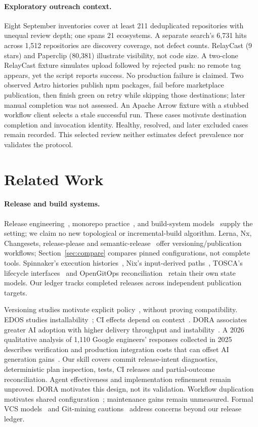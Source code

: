 \paragraph{Exploratory outreach context.}
Eight September inventories cover at least 211 deduplicated repositories with
unequal review depth; one spans 21 ecosystems. A separate search's 6,731 hits
across 1,512 repositories are discovery coverage, not defect counts.
RelayCast (9 stars) and Paperclip (80,381) illustrate visibility, not code size.
A two-clone RelayCast fixture simulates upload followed by rejected push:
no remote tag appears, yet the script reports success. No production failure
is claimed. Two observed Astro histories publish npm packages, fail before
marketplace publication, then finish green on retry while skipping those
destinations; later manual completion was not assessed. An Apache Arrow
fixture with a stubbed workflow client selects a stale successful run.
These cases motivate destination completion and invocation identity.
Healthy, resolved, and later excluded cases remain recorded. This selected
review neither estimates defect prevalence nor validates the protocol.

\section{Related Work}
\label{sec:related}
\paragraph{Release and build systems.}
Release engineering~\cite{adams}, monorepo practice~\cite{potvin}, and build-system
models~\cite{mokhov,pluto} supply the setting; we claim no new topological or
incremental-build algorithm. Lerna, Nx, Changesets, release-please and
semantic-release~\cite{lerna,nx,changesets,releaseplease,semanticrelease} offer
versioning/publication workflows; Section~\ref{sec:compare} compares pinned
configurations, not complete tools. Spinnaker's execution histories~\cite{spinnaker},
Nix's input-derived paths~\cite{nix}, TOSCA's lifecycle interfaces~\cite{tosca}
and OpenGitOps reconciliation~\cite{gitops} retain their own state models.
Our ledger tracks completed releases across independent publication targets.

Versioning studies motivate explicit policy~\cite{raemaekers,bogart,decan},
without proving compatibility. EDOS studies installability~\cite{edos};
CI effects depend on context~\cite{huangci}.
DORA associates greater AI adoption with higher delivery throughput and
instability~\cite{dora2025}. A 2026 qualitative analysis of 1,110 Google
engineers' responses collected in 2025 describes verification and production
integration costs that can offset AI generation gains~\cite{dora2026tensions}.
Our skill covers commit release-intent diagnostics, deterministic plan inspection,
tests, CI releases and partial-outcome reconciliation. Agent effectiveness and
implementation refinement remain unproved. DORA motivates this design, not its validation.
Workflow duplication motivates shared configuration~\cite{cardoen};
maintenance gains remain unmeasured. Formal VCS models~\cite{swierstraloh,hpt,mimram,mrdt}
and Git-mining cautions~\cite{birdgit} address concerns beyond our release ledger.

